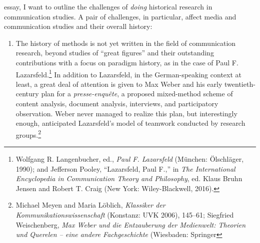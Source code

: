\documentclass{tufte-handout}
\begin{document}
\begin{titlepage}
\begin{fullwidth}
\end{fullwidth}

\vspace*{1em}


 essay, I want to outline the challenges of \emph{doing}
historical research in communication studies. A pair of challenges, in
particular, affect media and communication studies and their overall
history:

\begin{enumerate}
\item
  The history of methods is not yet written in the field of
  communication research, beyond studies of ``great figures'' and their
  outstanding contributions with a focus on paradigm history, as in the
  case of Paul F. Lazarsfeld.\footnote{Wolfgang R. Langenbucher, ed.,
    \emph{Paul F. Lazarsfeld} (München: Ölschläger, 1990); and Jefferson
    Pooley, ``Lazarsfeld, Paul F.,'' in \emph{The International
    Encyclopedia in Communication Theory and Philosophy}, ed. Klaus
    Bruhn Jensen and Robert T. Craig (New York: Wiley-Blackwell, 2016).}
  In addition to Lazarsfeld, in the German-speaking context at least, a
  great deal of attention is given to Max Weber and his early
  twentieth-century plan for a \emph{presse-enquête}, a proposed
  mixed-method scheme of content analysis, document analysis,
  interviews, and participatory observation. Weber never managed to
  realize this plan, but interestingly enough, anticipated Lazarsfeld's
  model of teamwork conducted by research groups.\footnote{Michael Meyen
    and Maria Löblich, \emph{Klassiker der Kommunikationswissenschaft}
    (Konstanz: UVK 2006), 145--61; Siegfried Weischenberg, \emph{Max
    Weber und die Entzauberung der Medienwelt: Theorien und Querelen --
    eine andere Fachgeschichte} (Wiesbaden: Springer} 

\end{enumerate}


\enlargethispage{2\baselineskip}

\vspace*{2em}





 \end{titlepage}
\end{document}

